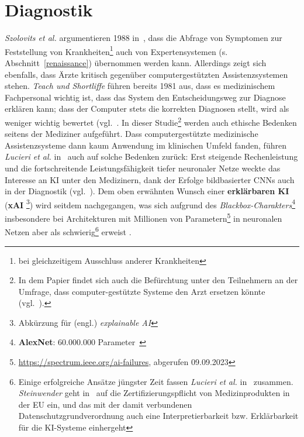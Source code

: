 \section{Diagnostik}\label{sec:diagnostik}
\textit{Szolovits et al.} argumentieren 1988 in~\cite{Szo88}, dass die Abfrage von Symptomen zur Feststellung von Krankheiten\footnote{
    bei gleichzeitigem Ausschluss anderer Krankheiten
} auch von Expertensystemen (s. Abschnitt~\ref{renaissance}) übernommen werden kann. Allerdings zeigt sich ebenfalls, dass Ärzte kritisch gegenüber computergestützten Assistenzsystemen stehen. \textit{Teach und Shortliffe} führen bereits 1981 aus, dass es medizinischem Fachpersonal wichtig ist, dass das System den Entscheidungsweg zur Diagnose erklären kann; dass der Computer stets die korrekten Diagnosen stellt, wird als weniger wichtig bewertet (vgl.~\cite[551, ``Table V``: ``D.1`` sowie ``D14``]{TS81}. In dieser Studie\footnote{
    In dem Papier findet sich auch die Befürchtung unter den Teilnehmern an der Umfrage, dass computer-gestützte Systeme den Arzt ersetzen könnte (vgl.~\cite[543]{TS81}).
} werden auch ethische Bedenken seitens der Mediziner aufgeführt. Dass computergestützte medizinische Assistenzsysteme dann kaum Anwendung im klinischen Umfeld fanden, führen \textit{Lucieri et al.} in~\cite{LBDA22} auch auf solche Bedenken zurück: Erst steigende Rechenleistung und die fortschreitende Leistungsfähigkeit tiefer neuronaler Netze weckte das Interesse an KI unter den Medizinern, dank der Erfolge bildbasierter CNNs auch in der Diagnostik (vgl.~\cite[728]{LBDA22}). Dem oben erwähnten Wunsch einer \textbf{erklärbaren KI} (\textbf{xAI} \footnote{
    Abkürzung für (engl.) \textit{explainable AI}
}) wird seitdem nachgegangen, was sich aufgrund des \textit{Blackbox-Charakters}\footnote{
    \textbf{AlexNet}: 60.000.000 Parameter~\cite[1]{KSH12}
} insbesondere bei Architekturen mit Millionen von Parametern\footnote{
    \url{https://spectrum.ieee.org/ai-failures}, abgerufen 09.09.2023
} in neuronalen Netzen aber als schwierig\footnote{
    Einige erfolgreiche Ansätze jüngster Zeit fassen \textit{Lucieri et al.} in~\cite[733 ff]{LBDA22} zusammen. \textit{Steinwender} geht in~\cite[765]{Ste22} auf die Zertifizierungspflicht von Medizinprodukten in der EU ein, und das mit der damit verbundenen Datenschutzgrundverordnung auch eine Interpretierbarkeit bzw. Erklärbarkeit für die KI-Systeme einhergeht
} erweist
.
